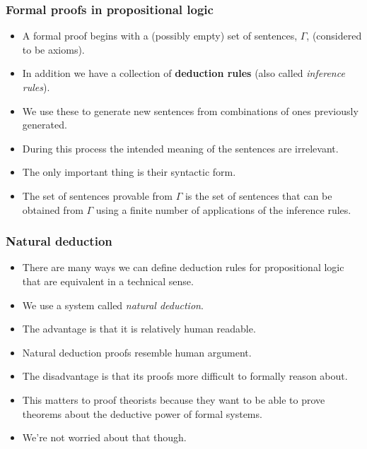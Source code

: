 \documentclass[handout]{beamer}
\begin{document}
\begin{frame}
\frametitle{Formal proofs in propositional logic}
\begin{itemize}
\item A formal proof begins with a (possibly empty) set of sentences, $\Gamma$, (considered to be axioms). 
\vspace{0.3cm}
\item In addition we have a collection of \textbf{deduction rules} (also called \emph{inference rules}). 
\vspace{0.3cm}
\item We use these to generate new sentences from combinations of ones previously generated. 
\vspace{0.3cm}
\item During this process the intended meaning of the sentences are irrelevant. 
\vspace{0.3cm}
\item The only important thing is their syntactic form. 
\vspace{0.3cm}
\item The set of sentences provable from $\Gamma$ is the set of sentences that can be obtained from $\Gamma$ using a finite number of applications of the inference rules.
\end{itemize}
\end{frame}

\begin{frame}
\frametitle{Natural deduction}
\begin{itemize}
\item There are many ways we can define deduction rules for propositional logic that are equivalent in a technical sense. 
\vspace{0.3cm}
\item We use a system called \emph{natural deduction}. 
\vspace{0.3cm}
\item The advantage is that it is relatively human readable. 
\vspace{0.3cm}
\item Natural deduction proofs resemble human argument. 
\vspace{0.3cm}
\item The disadvantage is that its proofs more difficult to formally reason about. 
\vspace{0.3cm}
\item This matters to proof theorists because they want to be able to prove theorems about the deductive power of formal systems. 
\vspace{0.3cm}
\item We're not worried about that though.
\end{itemize}
\end{frame}
\end{document}
